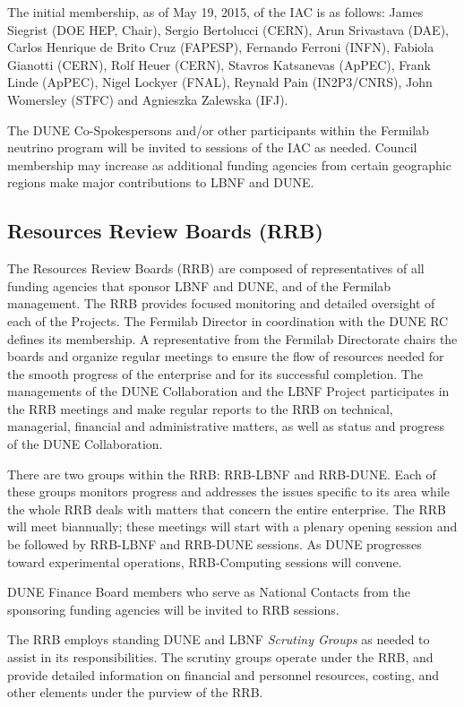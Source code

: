 The initial membership, as of May 19, 2015, of the IAC is as follows:
James Siegrist (DOE HEP, Chair),
Sergio Bertolucci (CERN),
Arun Srivastava (DAE),
Carlos Henrique de Brito Cruz (FAPESP),
Fernando Ferroni (INFN),
Fabiola Gianotti (CERN),
Rolf Heuer (CERN),
Stavros Katsanevas (ApPEC),
Frank Linde (ApPEC),
Nigel Lockyer (FNAL),
Reynald Pain (IN2P3/CNRS),
John Womersley (STFC) and
Agnieszka Zalewska (IFJ).

The DUNE Co-Spokespersons and/or other participants within
the Fermilab neutrino program will be invited to sessions of the IAC as
needed. Council membership may increase as additional funding agencies
from certain geographic regions make major contributions to LBNF and DUNE.

\subsection{Resources Review Boards (RRB)}

The Resources Review Boards (RRB) are composed of representatives of all
funding agencies that sponsor LBNF and DUNE, and of the Fermilab
management. The RRB provides focused monitoring and detailed oversight
of each of the Projects. The Fermilab Director in coordination
with the DUNE RC defines its membership. A representative from the
Fermilab Directorate chairs the boards and
organize regular meetings to ensure the flow of resources needed
for the smooth progress of the enterprise 
and for its successful completion.  
The managements of the
DUNE Collaboration and the LBNF Project participates in the RRB meetings
and make regular reports to the RRB on technical, managerial,
financial and administrative matters, as well as status and
progress of the DUNE Collaboration.

There are two groups  
within the RRB: RRB-LBNF and RRB-DUNE. Each of
these groups monitors progress and addresses 
 the issues specific to its area 
 while the whole RRB deals with matters
that concern the entire enterprise. 
The RRB will meet
biannually; these meetings 
will start with a plenary
opening session 
and be followed by 
RRB-LBNF and RRB-DUNE sessions. As DUNE progresses toward
experimental operations, RRB-Computing sessions will convene.

DUNE Finance Board members who serve as National Contacts from the 
sponsoring funding agencies will be invited to RRB sessions.

The RRB  employs standing DUNE and LBNF \textit{Scrutiny Groups} as needed
to assist in its responsibilities. The scrutiny groups operate
under the RRB, and provide detailed information on financial and
personnel resources, costing, and other elements under the purview of the RRB.

